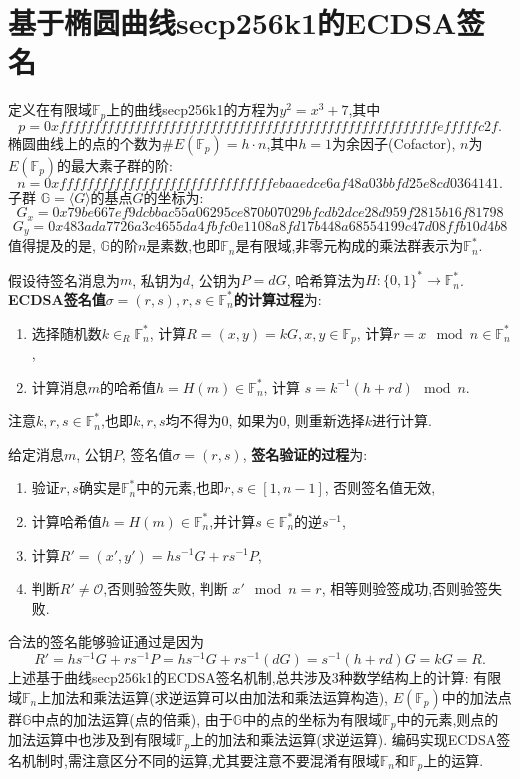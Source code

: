 \documentclass{article}
\renewcommand{\G}{\mathbb{G}}
\newcommand{\F}{\mathbb{F}}
\begin{document}
\section{基于椭圆曲线secp256k1的ECDSA签名}

定义在有限域$\F_p$上的曲线secp256k1的方程为$y^2 = x^3 + 7$,其中
\footnotesize
$$p = 0xfffffffffffffffffffffffffffffffffffffffffffffffffffffffefffffc2f.$$
\normalsize
椭圆曲线上的点的个数为$\#E(\F_p) = h \cdot n$,其中$h = 1$为余因子(Cofactor), $n$为$E(\F_p)$的最大素子群的阶:
\footnotesize
$$ n = 0xfffffffffffffffffffffffffffffffebaaedce6af48a03bbfd25e8cd0364141.$$
\normalsize
子群 $\G = \langle G \rangle$的基点$G$的坐标为:
\footnotesize
$$G_x = 0x79be667ef9dcbbac55a06295ce870b07029bfcdb2dce28d959f2815b16f81798$$
$$G_y = 0x483ada7726a3c4655da4fbfc0e1108a8fd17b448a68554199c47d08ffb10d4b8$$
\normalsize
值得提及的是, $\G$的阶$n$是素数,也即$\F_n$是有限域,非零元构成的乘法群表示为$\F_n^*$.

假设待签名消息为$m$, 私钥为$d$, 公钥为$P=dG$, 哈希算法为$H: \{0,1\}^*\rightarrow\F_n^*$.
\textbf{ECDSA签名值$\sigma = (r,s), r, s \in \F_n^*$的计算过程}为: 
\begin{enumerate}
\item 选择随机数$k\in_R\F_n^*$, 计算$R = (x,y) = kG, x, y \in \F_p$, 计算$r = x\mod n \in \F_n^*$,
\item 计算消息$m$的哈希值$h=H(m)\in\F_n^*$, 计算 $s = k^{-1} (h + rd) \mod n$. 
\end{enumerate}
注意$k, r, s \in \F_n^*$,也即$k, r, s$均不得为0, 如果为0, 则重新选择$k$进行计算.

给定消息$m$, 公钥$P$, 签名值$\sigma = (r, s)$, \textbf{签名验证的过程}为:
\begin{enumerate}
\item  验证$r, s$确实是$\F_n^*$中的元素,也即$r, s \in [1, n-1]$, 否则签名值无效,
\item 计算哈希值$h=H(m)\in\F_n^*$,并计算$s\in\F_n^*$的逆$s^{-1}$,
\item  计算$R' = (x', y') = hs^{-1}G + rs^{-1}P$, 
\item 判断$R' \neq \mathcal{O}$,否则验签失败, 判断 $x' \mod n = r$, 相等则验签成功,否则验签失败.
\end{enumerate}
合法的签名能够验证通过是因为
$$R' = hs^{-1}G + rs^{-1}P = hs^{-1}G + rs^{-1}(dG) = s^{-1}(h+rd)G = kG = R.$$
上述基于曲线secp256k1的ECDSA签名机制,总共涉及3种数学结构上的计算:
有限域$\F_n$上加法和乘法运算(求逆运算可以由加法和乘法运算构造), $E(\F_p)$中的加法点群$\G$中点的加法运算(点的倍乘),
由于$\G$中的点的坐标为有限域$\F_p$中的元素,则点的加法运算中也涉及到有限域$\F_p$上的加法和乘法运算(求逆运算).
编码实现ECDSA签名机制时,需注意区分不同的运算,尤其要注意不要混淆有限域$\F_n$和$\F_p$上的运算.
\end{document}
